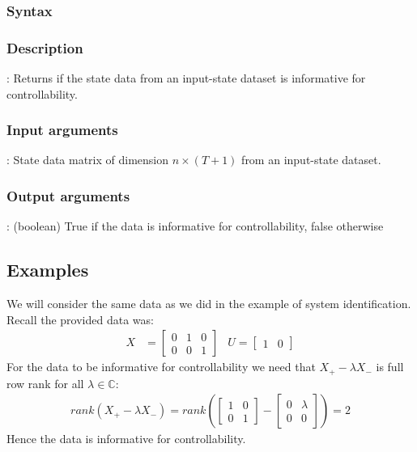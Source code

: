 \subsubsection*{Syntax}

\subsubsection*{Description}
: Returns if the state data from an input-state dataset is informative for controllability.

\subsubsection*{Input arguments}
\textbf{}: State data matrix of dimension $n \times (T+1)$ from an input-state dataset.

\subsubsection*{Output arguments}
\textbf{}: (boolean) True if the data is informative for controllability, false otherwise

\subsection{Examples} \label{NotIdentifyButControllable}
We will consider the same data as we did in the example of system identification. Recall the provided data was:
\begin{align*}
X &= \begin{bmatrix} 0&1&0 \\ 0&0&1 \end{bmatrix} & U = \begin{bmatrix}	1&0	\end{bmatrix}
\end{align*} 
For the data to be informative for controllability we need that $X_+ - \lambda X_-$ is full row rank for all $\lambda \in \mathbb{C}$:
\begin{align*}
rank(X_+ - \lambda X_-) = rank\left(\begin{bmatrix} 1&0\\0&1\end{bmatrix} - \begin{bmatrix} 0&\lambda\\0&0\end{bmatrix}\right) = 2
\end{align*}
Hence the data is informative for controllability. 


